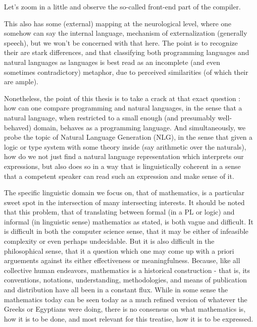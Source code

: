 Let's zoom in a little and observe the so-called front-end part of the compiler. 


This also has some (external) mapping at the neurological level, where one
somehow can say the internal language, mechanism of externalization (generally
speech), but we won't be concerned with that here. The point is to recognize
their are stark differences, and that classifying both programming languages and
natural languages as languages is best read as an incomplete (and even sometimes
contradictory) metaphor, due to perceived similarities (of which their are
ample).

Nonetheless, the point of this thesis is to take a crack at that exact question
: how can one compare programming and natural languages, in the sense that a
natural language, when restricted to a small enough (and presumably
well-behaved) domain, behaves as a programming language. And simultaneously, we
probe the topic of Natural Language Generation (NLG), in the sense that given a
logic or type system with some theory inside (say arithmetic over the naturals),
how do we not just find a natural language representation which interprets our
expressions, but also does so in a way that is linguistically coherent in a
sense that a competent speaker can read such an expression and make sense of it.

The specific linguistic domain we focus on, that of mathematics, is a particular
sweet spot in the intersection of many intersecting interests. It should be
noted that this problem, that of translating between formal (in a PL or logic)
and informal (in linguistic sense) mathematics as stated, is both vague and
difficult. It is difficult in both the computer science sense, that it may be
either of infeasible complexity or even perhaps undecidable. But it is also
difficult in the philosophical sense, that it a question which one may come up
with a priori arguements against its either effectiveness or meaningfulness.
Because, like all collective human endeavors, mathematics is a historical
construction - that is, its conventions, notations, understanding,
methodologies, and means of publication and distribution have all been in a
constant flux. While in some sense the mathematics today can be seen today as a
much refined version of whatever the Greeks or Egyptians were doing, there is no
consensus on what mathematics is, how it is to be done, and most relevant for
this treatise, how it is to be expressed.

